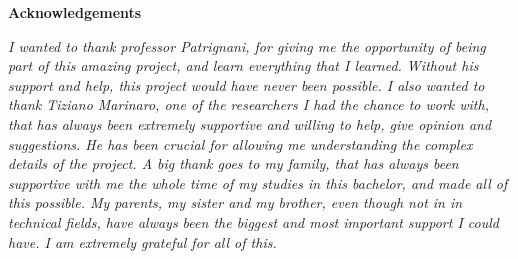 \thispagestyle{empty}

\begin{center}
  {\bf \Huge Acknowledgements}
\end{center}

\vspace{4cm}
\emph{ I wanted to thank professor Patrignani, for giving me the opportunity of
being part of this amazing project, and learn everything that I learned. Without
his support and help, this project would have never been possible. I also wanted
to thank Tiziano Marinaro, one of the researchers I had the chance to work with,
that has always been extremely supportive and willing to help, give opinion and suggestions.
He has been crucial for allowing me understanding the complex details of the
project. A big thank goes to my family, that has always been supportive with me
the whole time of my studies in this bachelor, and made all of this possible. My
parents, my sister and my brother, even though not in in technical fields, have always
been the biggest and most important support I could have. I am extremely
grateful for all of this. \\}